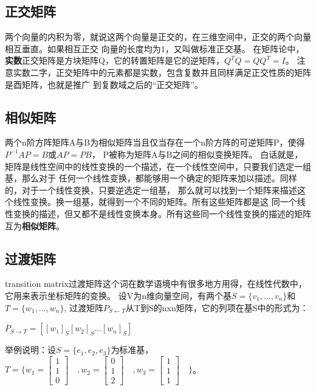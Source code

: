 \subsection{正交矩阵}
两个向量的内积为零，就说这两个向量是正交的，在三维空间中，正交的两个向量相互垂直。如果相互正交
向量的长度均为1，又叫做标准正交基。
在矩阵论中，\textbf{实数}正交矩阵是方块矩阵Q，它的转置矩阵是它的逆矩阵，$Q^TQ=QQ^T=I$。
注意实数二字，正交矩阵中的元素都是实数，包含复数并且同样满足正交性质的矩阵是酉矩阵，也就是推广
到复数域之后的“正交矩阵”。

\subsection{相似矩阵}
两个n阶方阵矩阵A与B为相似矩阵当且仅当存在一个n阶方阵的可逆矩阵P，使得$P^{-1}AP=B$或$AP=PB$，
P被称为矩阵A与B之间的相似变换矩阵。
白话就是，矩阵是线性空间中的线性变换的一个描述，在一个线性空间中，只要我们选定一组基，那么对于
任何一个线性变换，都能够用一个确定的矩阵来加以描述。同样的，对于一个线性变换，只要逆选定一组基，
那么就可以找到一个矩阵来描述这个线性变换。换一组基，就得到一个不同的矩阵。所有这些矩阵都是这
同一个线性变换的描述，但又都不是线性变换本身。所有这些同一个线性变换的描述的矩阵互为\textbf{相似矩阵}。

\subsection{过渡矩阵}
transition matrix过渡矩阵这个词在数学语境中有很多地方用得，在线性代数中，它用来表示坐标矩阵的变换。
\newline
设V为n维向量空间，有两个基$S=\{v_1,...,v_n\}$和$T=\{w_1,...,w_n\}$,
过渡矩阵$P_{S \leftarrow T}$从T到S的nxn矩阵，它的列项在基S中的形式为：

\begin{math}
    P_{S \rightarrow T} = [[w_1]_S [w_2]_S ... [w_n]_S]
\end{math}

举例说明：设$S=\{ e_1,e_2,e_3\}$为标准基，$T=\{ w_1=\begin{bmatrix} 1\\ 1\\ 0 \end{bmatrix}\quad, w_2=\begin{bmatrix}0\\1\\2\end{bmatrix}\quad 
, w_3=\begin{bmatrix} 1\\1\\1 \end{bmatrix}\quad \}$。

